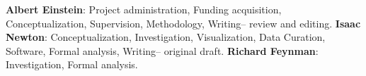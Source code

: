 \textbf{Albert Einstein}: Project administration, Funding acquisition, Conceptualization, Supervision, Methodology, Writing– review and editing. \textbf{Isaac Newton}: Conceptualization, Investigation, Visualization, Data Curation, Software, Formal analysis, Writing– original draft. \textbf{Richard Feynman}: Investigation, Formal analysis. 